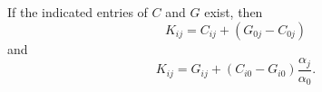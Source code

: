 If the indicated entries of $C$ and $G$ exist, then
$$K_{ij} = C_{ij} + (G_{0j} - C_{0j})$$
and
$$K_{ij} = G_{ij} + (C_{i0} - G_{i0}) \frac{\alpha_j}{\alpha_0}.$$
